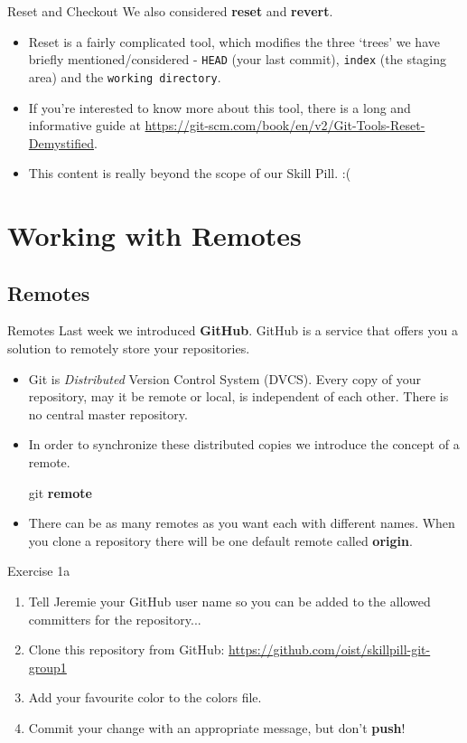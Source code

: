 \documentclass{beamer}
\begin{document}
\begin{frame}[fragile]{Reset and Checkout}
  We also considered \textbf{reset} and \textbf{revert}.
  \begin{itemize}
    \item Reset is a fairly complicated tool, which modifies the three \lq{}trees\rq{} we have briefly mentioned/considered - \texttt{HEAD} (your last commit), \texttt{index} (the staging area) and the \texttt{working directory}.
    \item If you\rq{}re interested to know more about this tool, there is a long and informative guide at \url{https://git-scm.com/book/en/v2/Git-Tools-Reset-Demystified}.
    \item This content is really beyond the scope of our Skill Pill. :(
  \end{itemize}
\end{frame}


\section{Working with Remotes}
\subsection{Remotes}
\begin{frame}[fragile]{Remotes}
Last week we introduced \textbf{GitHub}. GitHub is a service that offers you a solution to remotely store your repositories.
\begin{itemize}
    \item Git is \emph{Distributed} Version Control System (DVCS). Every copy of your repository, may it be remote or local, is independent of each other. There is no central master repository. 
    \item In order to synchronize these distributed copies we introduce the concept of a remote.
  \begin{block}{}
    git \textbf{remote}
  \end{block}
  \item There can be as many remotes as you want each with different names. When you clone a repository there will be one default remote called \textbf{origin}.
\end{itemize}
\end{frame}

\begin{frame}
  \begin{block}{Exercise 1a}
    \begin{enumerate}
      \item Tell Jeremie your GitHub user name so you can be added to the allowed committers for the repository...
      \item Clone this repository from GitHub: \url{https://github.com/oist/skillpill-git-group1}
      \item Add your favourite color to the colors file.
      \item Commit your change with an appropriate message, but don\rq{}t \textbf{push}!
    \end{enumerate}
  \end{block}
\end{frame}
\end{document}
